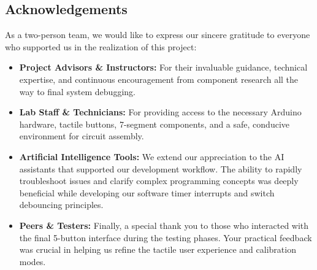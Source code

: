 \documentclass[journal,12pt,onecolumn]{IEEEtran}
\begin{document}
		\subsection*{Acknowledgements}
		As a two-person team, we would like to express our sincere gratitude to everyone who supported us in the realization of this project:
		
		\begin{itemize}
			\item \textbf{Project Advisors \& Instructors:} For their invaluable guidance, technical expertise, and continuous encouragement from component research all the way to final system debugging. 
			\item \textbf{Lab Staff \& Technicians:} For providing access to the necessary Arduino hardware, tactile buttons, 7-segment components, and a safe, conducive environment for circuit assembly.
			\item \textbf{Artificial Intelligence Tools:} We extend our appreciation to the AI assistants that supported our development workflow. The ability to rapidly troubleshoot issues and clarify complex programming concepts was deeply beneficial while developing our software timer interrupts and switch debouncing principles.
			\item \textbf{Peers \& Testers:} Finally, a special thank you to those who interacted with the final 5-button interface during the testing phases. Your practical feedback was crucial in helping us refine the tactile user experience and calibration modes.
		\end{itemize}
		
	
\end{document}
